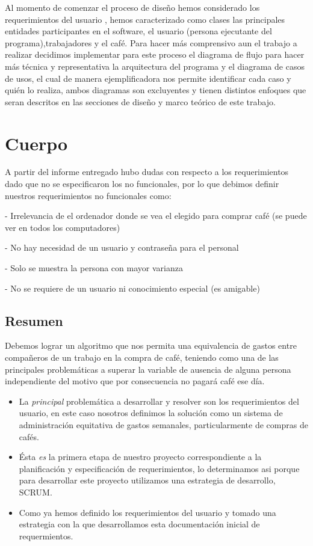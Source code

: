 \documentclass[twocolumn,11pts]{IEEEtran}
\begin{document}
Al momento de comenzar el proceso de diseño hemos considerado los requerimientos del usuario , hemos caracterizado como clases las principales entidades participantes en el software, el usuario (persona ejecutante del programa),trabajadores y el café.
Para hacer más comprensivo aun el trabajo a realizar decidimos implementar para este proceso el diagrama de flujo para hacer más técnica y representativa la arquitectura del programa y el diagrama de casos de usos, el cual de manera ejemplificadora nos permite identificar cada caso y quién lo realiza, ambos diagramas son excluyentes y tienen distintos enfoques que seran descritos en las secciones de diseño y marco teórico de este trabajo.

\section{Cuerpo}

A partir del informe entregado hubo dudas con respecto a los requerimientos dado que no se especificaron los no funcionales, por lo que debimos definir nuestros requerimientos no funcionales como: 

- Irrelevancia de el ordenador donde se vea el elegido para comprar café (se puede ver en todos los computadores)

- No hay necesidad de un usuario y contraseña para el personal

- Solo se muestra la persona con mayor varianza

- No se requiere de un usuario ni conocimiento especial (es amigable)

\subsection{Resumen}

Debemos lograr un algoritmo que nos permita una equivalencia de gastos entre compañeros de un trabajo en la compra de café, teniendo como una de las principales problemáticas a superar la variable de ausencia de alguna persona independiente del motivo que por consecuencia no pagará café ese día.
\begin{itemize}
\item La \emph{principal} problemática a desarrollar y resolver son los requerimientos del usuario, en este caso nosotros definimos la solución como un sistema de administración equitativa de gastos semanales, particularmente de compras de cafés.
\item Ésta \emph{es} la primera etapa de nuestro proyecto correspondiente a la planificación y especificación de requerimientos, lo determinamos asi porque para desarrollar este proyecto utilizamos una estrategia de desarrollo, SCRUM.
\item Como ya hemos definido los requerimientos del usuario y tomado una estrategia con la que desarrollamos esta documentación inicial de requermientos.
\end{itemize}
\end{document}
